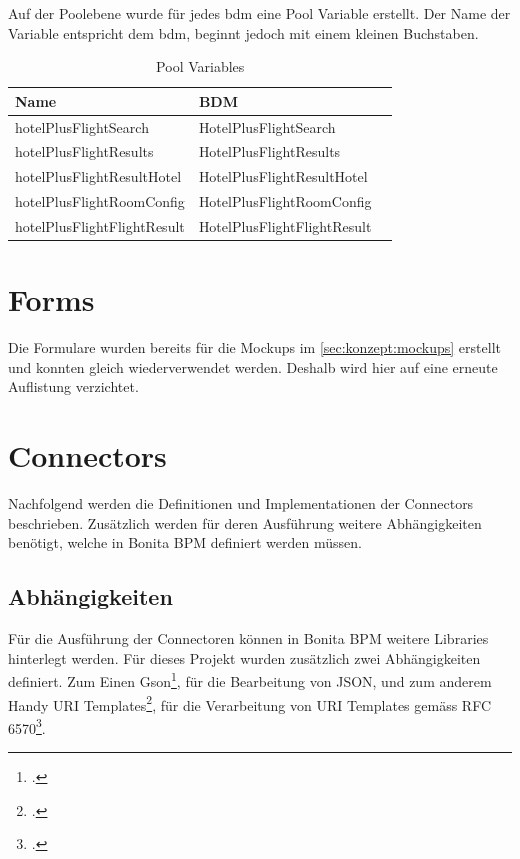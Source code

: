 Auf der Poolebene wurde für jedes \gls{bdm} eine Pool Variable erstellt. Der Name der Variable entspricht dem \gls{bdm}, beginnt jedoch mit einem kleinen Buchstaben.
\begin{table}[H] 
	\caption{Pool Variables}
	\centering
	\label{sec:umsetzung:bdm:poolvariable}
	
	\begin{tabular}{ | l | l | c | } 
		\hline
		\textbf{Name} & \textbf{BDM} \\ \hline 
		hotelPlusFlightSearch & HotelPlusFlightSearch \\ \hline
		hotelPlusFlightResults & HotelPlusFlightResults \\ \hline
		hotelPlusFlightResultHotel & HotelPlusFlightResultHotel \\ \hline
		hotelPlusFlightRoomConfig & HotelPlusFlightRoomConfig \\ \hline
	 	hotelPlusFlightFlightResult & HotelPlusFlightFlightResult \\ \hline
	\end{tabular} 
\end{table}
\section{Forms}
Die Formulare wurden bereits für die Mockups im \cref{sec:konzept:mockups}  erstellt und konnten gleich wiederverwendet werden. Deshalb wird hier auf eine erneute Auflistung verzichtet.

\section{Connectors}
Nachfolgend werden die Definitionen und Implementationen der Connectors beschrieben. Zusätzlich werden für deren Ausführung weitere Abhängigkeiten benötigt, welche in Bonita BPM definiert werden müssen.

\subsection{Abhängigkeiten}
Für die Ausführung der Connectoren können in Bonita BPM weitere Libraries hinterlegt werden. Für dieses Projekt wurden zusätzlich zwei Abhängigkeiten definiert. Zum Einen Gson\footcite{Gson_2016-06-12}, für die Bearbeitung von JSON, und zum anderem Handy URI Templates\footcite{HandyUriTempaltes_2016-06-12}, für die Verarbeitung von URI Templates gemäss RFC 6570\footcite{RFC_6570_-_URI_Template_2016-06-21}.

